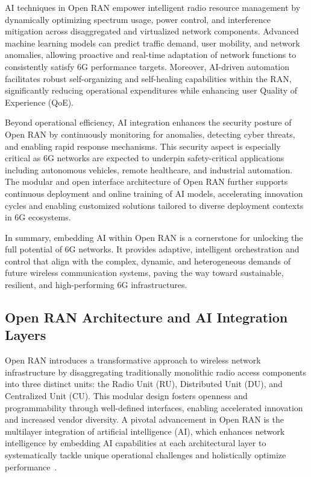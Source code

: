 \documentclass[sigconf]{acmart}
\begin{document}
AI techniques in Open RAN empower intelligent radio resource management by dynamically optimizing spectrum usage, power control, and interference mitigation across disaggregated and virtualized network components. Advanced machine learning models can predict traffic demand, user mobility, and network anomalies, allowing proactive and real-time adaptation of network functions to consistently satisfy 6G performance targets. Moreover, AI-driven automation facilitates robust self-organizing and self-healing capabilities within the RAN, significantly reducing operational expenditures while enhancing user Quality of Experience (QoE).

Beyond operational efficiency, AI integration enhances the security posture of Open RAN by continuously monitoring for anomalies, detecting cyber threats, and enabling rapid response mechanisms. This security aspect is especially critical as 6G networks are expected to underpin safety-critical applications including autonomous vehicles, remote healthcare, and industrial automation. The modular and open interface architecture of Open RAN further supports continuous deployment and online training of AI models, accelerating innovation cycles and enabling customized solutions tailored to diverse deployment contexts in 6G ecosystems.

In summary, embedding AI within Open RAN is a cornerstone for unlocking the full potential of 6G networks. It provides adaptive, intelligent orchestration and control that align with the complex, dynamic, and heterogeneous demands of future wireless communication systems, paving the way toward sustainable, resilient, and high-performing 6G infrastructures.

\subsection{Open RAN Architecture and AI Integration Layers}

Open RAN introduces a transformative approach to wireless network infrastructure by disaggregating traditionally monolithic radio access components into three distinct units: the Radio Unit (RU), Distributed Unit (DU), and Centralized Unit (CU). This modular design fosters openness and programmability through well-defined interfaces, enabling accelerated innovation and increased vendor diversity. A pivotal advancement in Open RAN is the multilayer integration of artificial intelligence (AI), which enhances network intelligence by embedding AI capabilities at each architectural layer to systematically tackle unique operational challenges and holistically optimize performance~\cite{ref54}.
\end{document}
